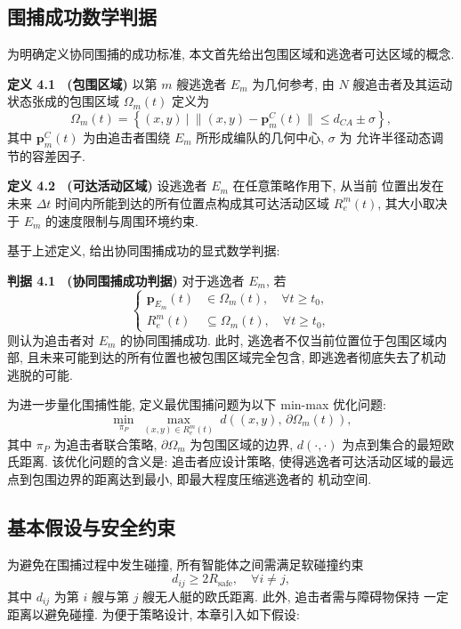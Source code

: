 \subsection{围捕成功数学判据}
\label{subsec:hunt_criterion}
为明确定义协同围捕的成功标准, 本文首先给出包围区域和逃逸者可达区域的概念.

\textbf{定义 4.1 \ (包围区域)} \quad 以第 $m$ 艘逃逸者 $E_m$ 为几何参考, 由 $N$
艘追击者及其运动状态张成的包围区域 $\Omega_m(t)$ 定义为
\begin{equation}
\Omega_m(t) = \left\{ (x,y)\ \Big|\ \|(x,y) - \mathbf{p}_m^C(t)\| \le d_{CA}\pm\sigma \right\},
\label{eq:besieged_area}
\end{equation}
其中 $\mathbf{p}_m^C(t)$ 为由追击者围绕 $E_m$ 所形成编队的几何中心, $\sigma$ 为
允许半径动态调节的容差因子.

\textbf{定义 4.2 \ (可达活动区域)} \quad 设逃逸者 $E_m$ 在任意策略作用下, 从当前
位置出发在未来 $\Delta t$ 时间内所能到达的所有位置点构成其可达活动区域 $R_e^m(t)$,
其大小取决于 $E_m$ 的速度限制与周围环境约束.

基于上述定义, 给出协同围捕成功的显式数学判据:

\textbf{判据 4.1 \ (协同围捕成功判据)} \quad 对于逃逸者 $E_m$, 若
\begin{equation}
\left\{
\begin{aligned}
\mathbf{p}_{E_m}(t) &\in \Omega_m(t), \quad \forall t\ge t_0, \\
R_e^m(t) &\subseteq \Omega_m(t), \quad \forall t\ge t_0,
\end{aligned}
\right.
\label{eq:hunt_cond}
\end{equation}
则认为追击者对 $E_m$ 的协同围捕成功. 此时, 逃逸者不仅当前位置位于包围区域内部,
且未来可能到达的所有位置也被包围区域完全包含, 即逃逸者彻底失去了机动逃脱的可能.

为进一步量化围捕性能, 定义最优围捕问题为以下 min-max 优化问题:
\begin{equation}
\min_{\pi_{P}}\ \max_{(x,y)\in R_e^m(t)}\ d\!\left((x,y),\, \partial\Omega_m(t)\right),
\label{eq:min_max}
\end{equation}
其中 $\pi_P$ 为追击者联合策略, $\partial\Omega_m$ 为包围区域的边界,
$d(\cdot,\cdot)$ 为点到集合的最短欧氏距离. 该优化问题的含义是: 追击者应设计策略,
使得逃逸者可达活动区域的最远点到包围边界的距离达到最小, 即最大程度压缩逃逸者的
机动空间.

\subsection{基本假设与安全约束}
\label{subsec:hunt_assumption}
为避免在围捕过程中发生碰撞, 所有智能体之间需满足软碰撞约束
\begin{equation}
d_{ij} \ge 2R_{\mathrm{safe}}, \quad \forall i\ne j,
\label{eq:collision}
\end{equation}
其中 $d_{ij}$ 为第 $i$ 艘与第 $j$ 艘无人艇的欧氏距离. 此外, 追击者需与障碍物保持
一定距离以避免碰撞. 为便于策略设计, 本章引入如下假设:

